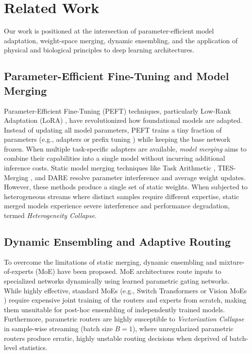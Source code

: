 \section{Related Work}
\label{sec:related_work}

Our work is positioned at the intersection of parameter-efficient model adaptation, weight-space merging, dynamic ensembling, and the application of physical and biological principles to deep learning architectures.

\subsection{Parameter-Efficient Fine-Tuning and Model Merging}
Parameter-Efficient Fine-Tuning (PEFT) techniques, particularly Low-Rank Adaptation (LoRA) \cite{hu21lora}, have revolutionized how foundational models are adapted. Instead of updating all model parameters, PEFT trains a tiny fraction of parameters (e.g., adapters \cite{houlsby19adapter} or prefix tuning \cite{liliang21prefix}) while keeping the base network frozen. When multiple task-specific adapters are available, \emph{model merging} aims to combine their capabilities into a single model without incurring additional inference costs. Static model merging techniques like Task Arithmetic \cite{ilharco22taskarithmetic}, TIES-Merging \cite{yadav23ties}, and DARE \cite{yu23dare} resolve parameter interference and average weight updates. However, these methods produce a single set of static weights. When subjected to heterogeneous streams where distinct samples require different expertise, static merged models experience severe interference and performance degradation, termed \emph{Heterogeneity Collapse}.

\subsection{Dynamic Ensembling and Adaptive Routing}
To overcome the limitations of static merging, dynamic ensembling and mixture-of-experts (MoE) \cite{shazeer17moe} have been proposed. MoE architectures route inputs to specialized networks dynamically using learned parametric gating networks. While highly effective, standard MoEs (e.g., Switch Transformers \cite{fedus21switch} or Vision MoEs \cite{riquelme21vmoe}) require expensive joint training of the routers and experts from scratch, making them unsuitable for post-hoc ensembling of independently trained models. Furthermore, parametric routers are highly susceptible to \emph{Vectorization Collapse} in sample-wise streaming (batch size $B=1$), where unregularized parametric routers produce erratic, highly unstable routing decisions when deprived of batch-level statistics. 

